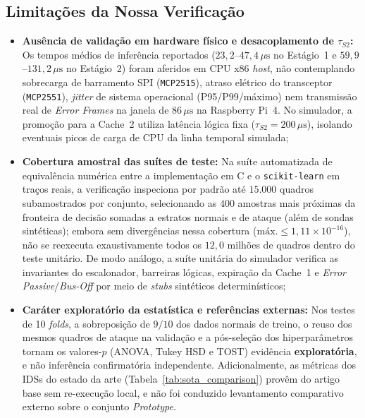 \documentclass[conference]{IEEEtran}
\begin{document}
\subsection*{Limitações da Nossa Verificação}
\begin{itemize}
    \item \textbf{Ausência de validação em hardware físico e desacoplamento de $\tau_{S2}$:} Os tempos médios de inferência reportados ($23{,}2$--$47{,}4\,\mu\text{s}$ no Estágio~1 e $59{,}9$--$131{,}2\,\mu\text{s}$ no Estágio~2) foram aferidos em CPU x86 \textit{host}, não contemplando sobrecarga de barramento SPI (\texttt{MCP2515}), atraso elétrico do transceptor (\texttt{MCP2551}), \textit{jitter} de sistema operacional (P95/P99/máximo) nem transmissão real de \textit{Error Frames} na janela de $86\,\mu\text{s}$ na Raspberry Pi~4. No simulador, a promoção para a Cache~2 utiliza latência lógica fixa ($\tau_{S2} = 200\,\mu\text{s}$), isolando eventuais picos de carga de CPU da linha temporal simulada;
    \item \textbf{Cobertura amostral das suítes de teste:} Na suíte automatizada de equivalência numérica \cite{repo_replication} entre a implementação em C e o \texttt{scikit-learn} em traços reais, a verificação inspeciona por padrão até $15.000$ quadros subamostrados por conjunto, selecionando as $400$ amostras mais próximas da fronteira de decisão somadas a estratos normais e de ataque (além de sondas sintéticas); embora sem divergências nessa cobertura ($\text{máx.} \le 1{,}11 \times 10^{-16}$), não se reexecuta exaustivamente todos os $12{,}0$ milhões de quadros dentro do teste unitário. De modo análogo, a suíte unitária do simulador verifica as invariantes do escalonador, barreiras lógicas, expiração da Cache~1 e \textit{Error Passive}/\textit{Bus-Off} por meio de \textit{stubs} sintéticos determinísticos;
    \item \textbf{Caráter exploratório da estatística e referências externas:} Nos testes de 10 \textit{folds}, a sobreposição de $9/10$ dos dados normais de treino, o reuso dos mesmos quadros de ataque na validação e a pós-seleção dos hiperparâmetros tornam os valores-$p$ (ANOVA, Tukey HSD e TOST) evidência \textbf{exploratória}, e não inferência confirmatória independente. Adicionalmente, as métricas dos IDSs do estado da arte (Tabela~\ref{tab:sota_comparison}) provêm do artigo base sem re-execução local, e não foi conduzido levantamento comparativo externo sobre o conjunto \textit{Prototype}.
\end{itemize}
\end{document}
